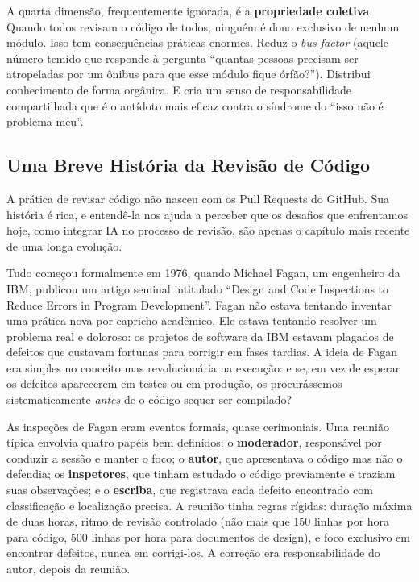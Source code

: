 A quarta dimensão, frequentemente ignorada, é a \textbf{propriedade coletiva}. Quando
todos revisam o código de todos, ninguém é dono exclusivo de nenhum módulo. Isso tem
consequências práticas enormes. Reduz o \textit{bus factor} (aquele número temido
que responde à pergunta ``quantas pessoas precisam ser atropeladas por um ônibus para
que esse módulo fique órfão?''). Distribui conhecimento de forma orgânica. E cria um
senso de responsabilidade compartilhada que é o antídoto mais eficaz contra o
síndrome do ``isso não é problema meu''.

\subsection{Uma Breve História da Revisão de Código}

A prática de revisar código não nasceu com os Pull Requests do GitHub. Sua história
é rica, e entendê-la nos ajuda a perceber que os desafios que enfrentamos hoje,
como integrar IA no processo de revisão, são apenas o capítulo mais recente de uma
longa evolução.

Tudo começou formalmente em 1976, quando Michael Fagan, um engenheiro da IBM, publicou
um artigo seminal intitulado ``Design and Code Inspections to Reduce Errors in Program
Development''. Fagan não estava tentando inventar uma prática nova por capricho
acadêmico. Ele estava tentando resolver um problema real e doloroso: os projetos de
software da IBM estavam plagados de defeitos que custavam fortunas para corrigir em
fases tardias. A ideia de Fagan era simples no conceito mas revolucionária na execução:
e se, em vez de esperar os defeitos aparecerem em testes ou em produção, os
procurássemos sistematicamente \textit{antes} de o código sequer ser compilado?

As inspeções de Fagan eram eventos formais, quase cerimoniais. Uma reunião típica
envolvia quatro papéis bem definidos: o \textbf{moderador}, responsável por conduzir a
sessão e manter o foco; o \textbf{autor}, que apresentava o código mas não o defendia;
os \textbf{inspetores}, que tinham estudado o código previamente e traziam suas
observações; e o \textbf{escriba}, que registrava cada defeito encontrado com
classificação e localização precisa. A reunião tinha regras rígidas: duração máxima
de duas horas, ritmo de revisão controlado (não mais que 150 linhas por hora para
código, 500 linhas por hora para documentos de design), e foco exclusivo em encontrar
defeitos, nunca em corrigi-los. A correção era responsabilidade do autor, depois da
reunião.

